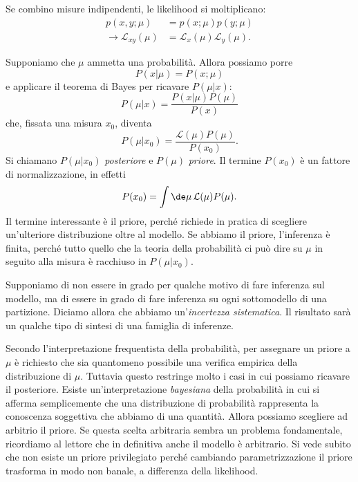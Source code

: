 Se combino misure indipendenti, le likelihood si moltiplicano:
\begin{align*}
	p(x,y;\mu) &= p(x;\mu) p(y;\mu) \\
	\rightarrow \mathcal L_{xy}(\mu) &= \mathcal L_x(\mu) \mathcal L_y(\mu).
\end{align*}

Supponiamo che $\mu$ ammetta una probabilità. Allora possiamo porre
\begin{equation*}
	P(x|\mu) = P(x;\mu)
\end{equation*}
e applicare il teorema di Bayes per ricavare $P(\mu|x)$:
\begin{equation*}
	P(\mu|x) = \frac{P(x|\mu)P(\mu)}{P(x)}
\end{equation*}
che, fissata una misura $x_0$, diventa
\begin{equation*}
	P(\mu|x_0) = \frac{\mathcal L(\mu) P(\mu)}{P(x_0)}.
\end{equation*}
Si chiamano $P(\mu|x_0)$ \emph{posteriore} e $P(\mu)$ \emph{priore}.
Il termine $P(x_0)$ è un fattore di normalizzazione, in effetti
\begin{equation*}
	P(x_0) = \int \de \mu\, \mathcal L(\mu) P(\mu).
\end{equation*}
Il termine interessante è il priore, perché richiede in pratica di scegliere un'ulteriore distribuzione oltre al modello.
Se abbiamo il priore, l'inferenza è finita, perché tutto quello che la teoria della probabilità ci può dire su $\mu$ in seguito alla misura è racchiuso in $P(\mu|x_0)$.

Supponiamo di non essere in grado per qualche motivo di fare inferenza sul modello, ma di essere in grado di fare inferenza su ogni sottomodello di una partizione.
Diciamo allora che abbiamo un'\emph{incertezza sistematica}.
Il risultato sarà un qualche tipo di sintesi di una famiglia di inferenze.

Secondo l'interpretazione frequentista della probabilità,
per assegnare un priore a $\mu$ è richiesto che sia quantomeno possibile una verifica empirica della distribuzione di $\mu$.
Tuttavia questo restringe molto i casi in cui possiamo ricavare il posteriore.
Esiste un'interpretazione \emph{bayesiana} della probabilità in cui si afferma semplicemente che una distribuzione di probabilità rappresenta la conoscenza soggettiva che abbiamo di una quantità.
Allora possiamo scegliere ad arbitrio il priore.
Se questa scelta arbitraria sembra un problema fondamentale,
ricordiamo al lettore che in definitiva anche il modello è arbitrario.
Si vede subito che non esiste un priore privilegiato perché cambiando parametrizzazione il priore trasforma in modo non banale, a differenza della likelihood.

